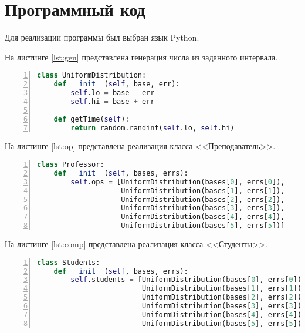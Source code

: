 \chapter{Программный код}

Для реализации программы был выбран язык Python. %

На листинге \ref{lst:gen} представлена генерация числа из заданного интервала.
\begin{lstlisting}[language=Python,
    frame= tb,
    numbers=left,
    numberstyle=\footnotesize,
    caption={Генерация числа из заданного интервала},
    label={lst:gen}]
class UniformDistribution:
	def __init__(self, base, err):
		self.lo = base - err
		self.hi = base + err

	def getTime(self):
		return random.randint(self.lo, self.hi)
\end{lstlisting}

На листинге \ref{lst:op} представлена реализация класса <<Преподаватель>>.
\begin{lstlisting}[language=Python,
	frame= tb,
	numbers=left,
	numberstyle=\footnotesize,
	caption={Реализация класса <<Преподаватель>>},
	label={lst:op}]
class Professor:
	def __init__(self, bases, errs):
		self.ops = [UniformDistribution(bases[0], errs[0]),
					UniformDistribution(bases[1], errs[1]),
					UniformDistribution(bases[2], errs[2]),
					UniformDistribution(bases[3], errs[3]),
					UniformDistribution(bases[4], errs[4]),
					UniformDistribution(bases[5], errs[5])]
\end{lstlisting}

На листинге \ref{lst:comp} представлена реализация класса <<Студенты>>.
\begin{lstlisting}[language=Python,
	frame= tb,
	numbers=left,
	numberstyle=\footnotesize,
	caption={Реализация класса  <<Студенты>>},
	label={lst:comp}]
class Students:
	def __init__(self, bases, errs):
		self.students = [UniformDistribution(bases[0], errs[0]),
						 UniformDistribution(bases[1], errs[1]),
						 UniformDistribution(bases[2], errs[2]),
						 UniformDistribution(bases[3], errs[3]),
						 UniformDistribution(bases[4], errs[4]),
						 UniformDistribution(bases[5], errs[5])]
\end{lstlisting}

